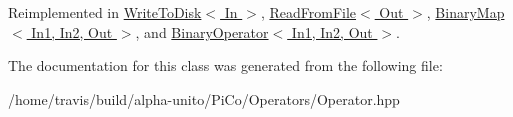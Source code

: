 \-Reimplemented in \hyperlink{class_write_to_disk_a3b57dac20171d5e166210183bceedea2}{\-Write\-To\-Disk$<$ In $>$}, \hyperlink{class_read_from_file_af509393aad1e80f25fee64991f365bbb}{\-Read\-From\-File$<$ Out $>$}, \hyperlink{class_binary_map_a891da29ca1c109f273e6b0448f261783}{\-Binary\-Map$<$ In1, In2, Out $>$}, and \hyperlink{class_binary_operator_a6df8c4e6dee857f27d870c30d4f65920}{\-Binary\-Operator$<$ In1, In2, Out $>$}.



\-The documentation for this class was generated from the following file\-:\begin{DoxyCompactItemize}
\item 
/home/travis/build/alpha-\/unito/\-Pi\-Co/\-Operators/\-Operator.\-hpp\end{DoxyCompactItemize}
